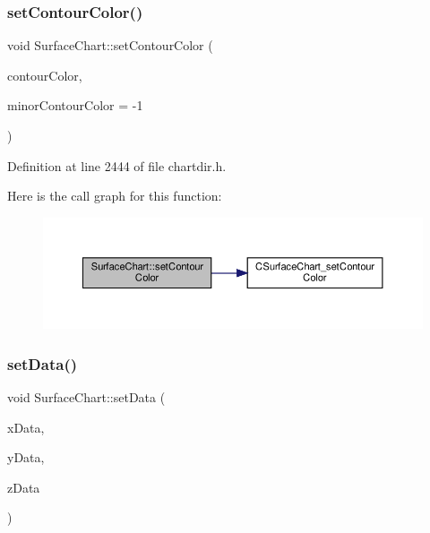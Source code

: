 \subsubsection{\texorpdfstring{set\+Contour\+Color()}{setContourColor()}}
{\footnotesize\ttfamily void Surface\+Chart\+::set\+Contour\+Color (\begin{DoxyParamCaption}\item[{int}]{contour\+Color,  }\item[{int}]{minor\+Contour\+Color = {\ttfamily -\/1} }\end{DoxyParamCaption})\hspace{0.3cm}{\ttfamily [inline]}}



Definition at line 2444 of file chartdir.\+h.

Here is the call graph for this function\+:
\nopagebreak
\begin{figure}[H]
\begin{center}
\leavevmode
\includegraphics[width=350pt]{class_surface_chart_afd3357880657ab5b2301c4a3c7d233bb_cgraph}
\end{center}
\end{figure}
\mbox{\label{class_surface_chart_a30e7444d85c949637b7f4a395db57120}} 
\subsubsection{\texorpdfstring{set\+Data()}{setData()}}
{\footnotesize\ttfamily void Surface\+Chart\+::set\+Data (\begin{DoxyParamCaption}\item[{\hyperlink{class_double_array}{Double\+Array}}]{x\+Data,  }\item[{\hyperlink{class_double_array}{Double\+Array}}]{y\+Data,  }\item[{\hyperlink{class_double_array}{Double\+Array}}]{z\+Data }\end{DoxyParamCaption})\hspace{0.3cm}{\ttfamily [inline]}}



